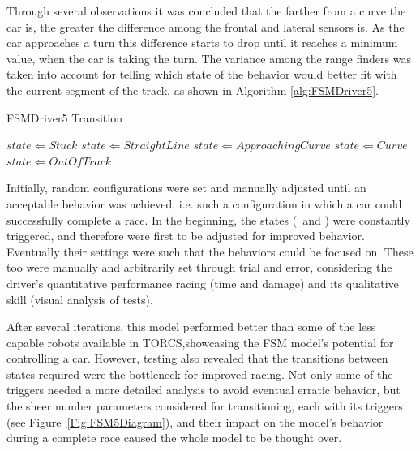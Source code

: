 Through several observations it was concluded that the farther from a curve the car is, the greater the difference among the frontal and lateral sensors is. As the car approaches a turn this difference starts to drop until it reaches a minimum value, when the car is taking the turn. The variance among the range finders was taken into account for telling which state of the  behavior would better fit with the current segment of the track, as shown in Algorithm \ref{alg:FSMDriver5}.

\begin{algorithm}[h]%
\caption{FSMDriver5 Transition}%
\label{alg:FSMDriver5}%
\begin{algorithmic}
        \STATE $state \Leftarrow Stuck$
    \ELSE
   		\STATE $state \Leftarrow StraightLine$
	\ENDIF
		\STATE $state \Leftarrow Approaching Curve$
		\STATE $state \Leftarrow Curve$
	\ELSE
		\STATE $state \Leftarrow Out Of Track$
	\ENDIF
\end{algorithmic}
\end{algorithm}

Initially, random configurations were set and manually adjusted until an acceptable behavior was achieved, i.e. such a configuration in which a car could successfully complete a race. In the beginning, the  states (\OT~and \St) were constantly triggered, and therefore were first to be adjusted for improved behavior. Eventually their settings were such that the  behaviors could be focused on. These too were manually and arbitrarily set through trial and error, considering the driver's quantitative performance racing (time and damage) and its qualitative skill (visual analysis of tests).

After several iterations, this model performed better than some of the less capable robots available in TORCS,showcasing the FSM model's potential for controlling a car. However, testing also revealed that the transitions between states required were the bottleneck for improved racing. Not only some of the triggers needed a more detailed analysis to avoid eventual erratic behavior, but the sheer number parameters considered for transitioning, each with its triggers (see Figure~\ref{Fig:FSM5Diagram}), and their impact on the model's behavior during a complete race caused the whole model to be thought over.

